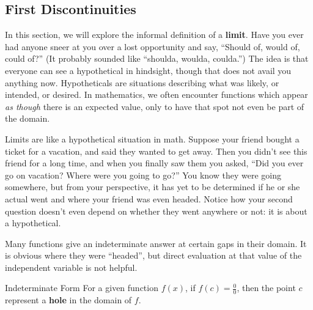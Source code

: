 
\subsection{First Discontinuities}


In this section, we will explore the informal definition of a \textbf{limit}.  Have you ever had anyone
sneer at you over a lost opportunity and say, ``Should of, would of, could of?''  (It probably
sounded like ``shoulda, woulda, coulda.'')  The idea is that everyone can see a hypothetical 
in hindsight, though that does not avail you anything now.  Hypotheticals are situations describing
what was likely, or intended, or desired.  In mathematics, we often encounter functions
which appear \textit{as though} there is an expected value, only to have that spot not
even be part of the domain.



Limits are like a hypothetical situation in math.  Suppose your friend bought a ticket for a vacation,
and said they wanted to get away.  Then you didn't see this friend for a long time, and when you
finally saw them you asked, ``Did you ever go on vacation?  Where were you going to go?''  
You know they  were going somewhere, but from your perspective, it has yet to be determined if
he or she actual went and where your friend was even headed.  Notice how your second question
doesn't even depend on whether they went anywhere or not: it is about a hypothetical.  

Many functions give an indeterminate answer at certain gaps in their domain.  It is obvious
where they were ``headed'', but direct evaluation at that value of the independent variable is
not helpful.



\begin{derivation}{Indeterminate Form}
For a given function $f(x)$, if $f(c)=\frac{0}{0}$, then the point $c$ represent a \textbf{hole} 
in the domain of $f$.
\end{derivation}


